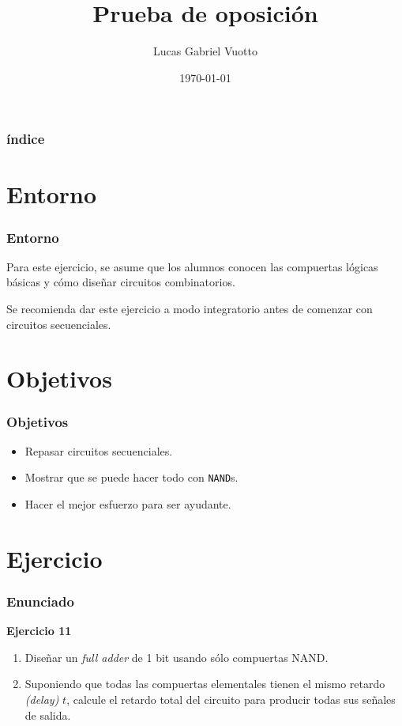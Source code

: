 \documentclass[mathserif,hyperref]{beamer}
\title{Prueba de oposición}
\author{Lucas Gabriel Vuotto}
\date{\today}
\begin{document}
\begin{frame}
\titlepage %
\end{frame}


\begin{frame}
\frametitle{índice}
\tableofcontents
\end{frame}


\section{Entorno}

\begin{frame}
\frametitle{Entorno}
Para este ejercicio, se asume que los alumnos conocen las compuertas lógicas
básicas y cómo diseñar circuitos combinatorios.

Se recomienda dar este ejercicio a modo integratorio antes de comenzar con
circuitos secuenciales.
\end{frame}


\section{Objetivos}

\begin{frame}
\frametitle{Objetivos}
\begin{itemize}
  \item Repasar circuitos secuenciales.
  \item Mostrar que se puede hacer todo con \texttt{NAND}s.
  \item Hacer el mejor esfuerzo para ser ayudante.
\end{itemize}
\end{frame}


\section{Ejercicio}

\begin{frame}
\frametitle{Enunciado}
\textbf{Ejercicio 11}
\begin{enumerate}
  \item Diseñar un \textit{full adder} de 1 bit usando sólo compuertas NAND.
  \item Suponiendo que todas las compuertas elementales tienen el mismo
  retardo \textit{(delay)} $t$, calcule el retardo total del circuito para
  producir todas sus señales de salida.
\end{enumerate}
\end{frame}
\end{document}
